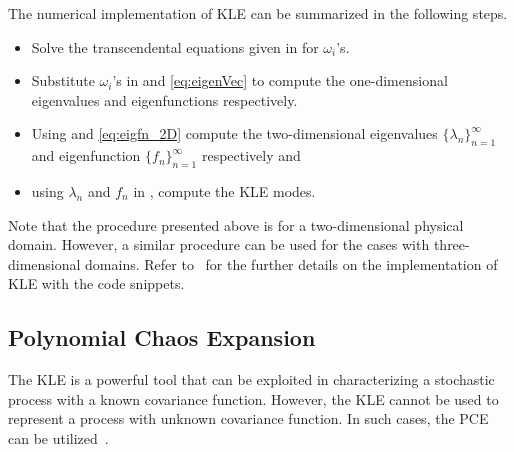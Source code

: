 \documentclass[letter,1p,11pt,oneside,onecolumn,sort&compress]{elsarticle}
\begin{document}
The numerical implementation of KLE can be summarized in the following steps.
\begin{itemize}
\item Solve the transcendental equations given in  for $\omega_i$'s. \item Substitute $\omega_i$'s in  and \eqref{eq:eigenVec} to compute the one-dimensional eigenvalues and eigenfunctions respectively. \item Using  and \eqref{eq:eigfn_2D} compute the two-dimensional eigenvalues $\{ \lambda_n \}_{n=1}^\infty$ and eigenfunction $ \{ f_{n} \}_{n=1}^\infty$ respectively and
\item using $\lambda_n$ and $f_n$ in , compute the KLE modes.
\end{itemize}
Note that the procedure presented above is for a two-dimensional physical domain. However, a similar procedure can be used for the cases with three-dimensional domains.
Refer to~\cite{desai2019scalable} for the further details on the implementation of KLE with the code snippets.

\subsection{Polynomial Chaos Expansion} \label{sec:PCE}
The KLE is a powerful tool that can be exploited in characterizing a stochastic process with a known covariance function.
However,
the KLE cannot be used to represent a process with unknown covariance function.
In such cases, the PCE can be utilized~\cite{ghanemSFEM1991,le2010spectral}.

\end{document}
